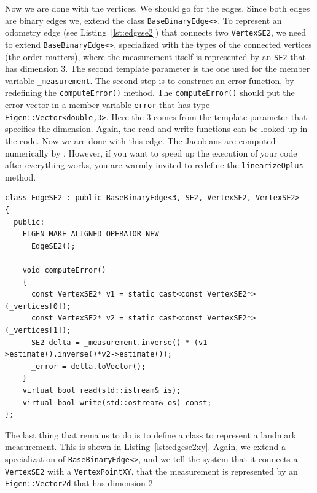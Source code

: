 \documentclass[a4paper]{article}
\begin{document}
Now we are done with the vertices. We should go for the edges.  Since
both edges are binary edges we, extend the class
\verb+BaseBinaryEdge<>+.
To represent an odometry edge (see Listing~\ref{lst:edgese2}) that
connects two \verb+VertexSE2+, we need to extend 
\verb+BaseBinaryEdge<>+,  specialized with the types of the
connected vertices (the order matters), where the measurement itself
is represented by an \verb+SE2+ that has dimension 3. The second
template parameter is the one used for the member variable
\verb+_measurement+.  The second step is to construct an error
function, by redefining the \verb+computeError()+ method.  The
\verb+computeError()+ should put the error vector in a member variable
\verb+error+ that has type \verb+Eigen::Vector<double,3>+. Here the 3
comes from the template parameter that specifies the dimension.
Again, the read and write functions can be looked up in the code.
Now we are done with this edge. The Jacobians are computed numerically
by \gopt{}.  However, if you want to speed up the execution of your
code after everything works, you are warmly invited to redefine the
\verb+linearizeOplus+ method.

\begin{lstlisting}[float,label=lst:edgese2,caption=\text{Edge connecting two
  robot poses, for example, the odometry of the robot.}]
class EdgeSE2 : public BaseBinaryEdge<3, SE2, VertexSE2, VertexSE2>
{
  public:
    EIGEN_MAKE_ALIGNED_OPERATOR_NEW
      EdgeSE2();

    void computeError()
    {
      const VertexSE2* v1 = static_cast<const VertexSE2*>(_vertices[0]);
      const VertexSE2* v2 = static_cast<const VertexSE2*>(_vertices[1]);
      SE2 delta = _measurement.inverse() * (v1->estimate().inverse()*v2->estimate());
      _error = delta.toVector();
    }
    virtual bool read(std::istream& is);
    virtual bool write(std::ostream& os) const;
};
\end{lstlisting}

The last thing that remains to do is to define a class to represent a
landmark measurement.  This is shown in Listing~\ref{lst:edgese2xy}.
Again, we extend a specialization of \verb+BaseBinaryEdge<>+, and we
tell the system that it connects a \verb+VertexSE2+ with a
\verb+VertexPointXY+, that the measurement is represented by an
\verb+Eigen::Vector2d+ that has dimension 2.
\end{document}
